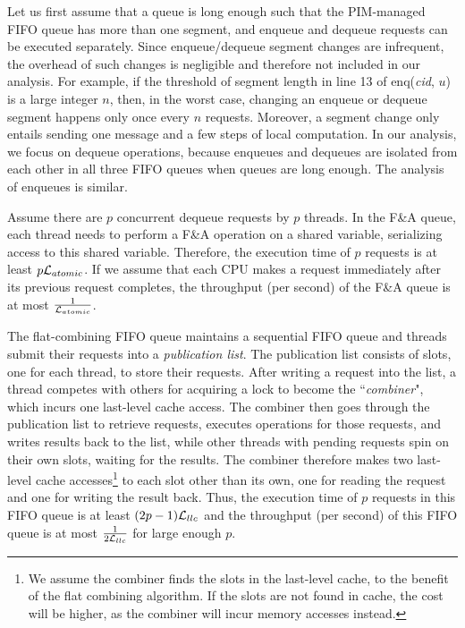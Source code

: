 Let us first assume that a queue is long enough such that the PIM-managed FIFO queue 
has more than one segment, and enqueue and dequeue requests can be executed separately. 
Since enqueue/dequeue segment changes are infrequent, 
the overhead of such changes is negligible and therefore not included in our analysis.
For example, if the threshold of segment length in line 13 of enq(\textit{cid}, $u$) is a large integer $n$, 
then, in the worst case, changing an enqueue or dequeue segment happens only once every $n$ requests.
Moreover, a segment change only entails sending one message and a few steps of local computation.
In our analysis, we focus on dequeue operations, because enqueues and dequeues are isolated from each other in all three FIFO queues when queues are long enough.
The analysis of enqueues is similar. 

Assume there are $p$ concurrent dequeue requests by $p$ threads. 
In the F\&A queue, each thread needs to perform a F\&A operation on a shared variable, 
serializing access to this shared variable. 
Therefore, 
the execution time of $p$ requests is at least $p\mathcal{L}_{atomic}$. 
If we assume that each CPU makes a request immediately after its previous request completes, 
the throughput (per second) of the F\&A queue is at most ${1 \over \mathcal{L}_{atomic}}$. 

The flat-combining FIFO queue maintains a sequential FIFO queue and 
threads submit their requests into a \emph{publication list}. 
The publication list consists of slots, one for each thread, to store their requests.
After writing a request into the list, a thread competes with others for acquiring a lock 
to become the ``\emph{combiner}", which incurs one last-level cache access. 
The combiner then goes through the publication list to retrieve requests, executes operations for those requests, 
and writes results back to the list, while other threads with pending requests spin on their own slots, 
waiting for the results. 
The combiner therefore makes two last-level cache accesses\footnote{We assume the combiner finds the slots 
in the last-level cache, to the benefit of the flat combining algorithm. If the slots are not found in cache, 
the cost will be higher, as the combiner will incur memory accesses instead.} to each slot other than its own, 
one for reading the request and one for writing the result back. 
Thus, the execution time of $p$ requests in this FIFO queue is at least $(2p-1)\mathcal{L}_{llc}$ and 
the throughput (per second) of this FIFO queue is at most ${1 \over 2\mathcal{L}_{llc}}$ for large enough $p$.

